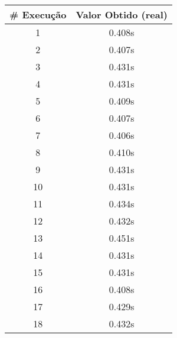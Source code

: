 \documentclass[11pt]{article}
\begin{document}
\begin{table}[!h]
\begin{center}
\begin{minipage}{0.48\textwidth}
\begin{tabular}{| c | c |}
				\textbf{\# Execução} &  \textbf{Valor Obtido (real)} \\ \hline
				1 & 0.408s \\ \hline
				2 & 0.407s \\ \hline
				3 & 0.431s \\ \hline
				4 & 0.431s \\ \hline
				5 & 0.409s \\ \hline
				6 & 0.407s \\ \hline
				7 & 0.406s \\ \hline
				8 & 0.410s \\ \hline
				9 & 0.431s \\ \hline
				10 & 0.431s \\ \hline
				11 & 0.434s \\ \hline
				12 & 0.432s \\ \hline
				13 & 0.451s \\ \hline
				14 & 0.431s \\ \hline
				15 & 0.431s \\ \hline
				16 & 0.408s \\ \hline
				17 & 0.429s \\ \hline
				18 & 0.432s \\ \hline
			\end{tabular}
		\end{minipage}
	\end{center}
\end{table}

\pagebreak
\end{document}
